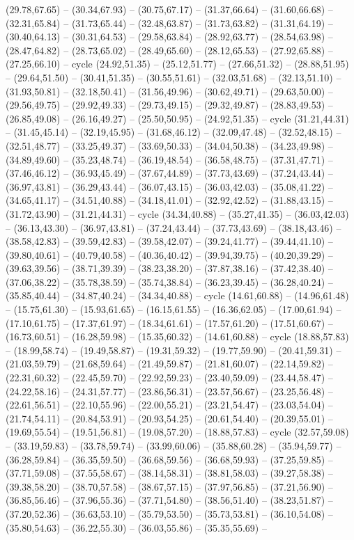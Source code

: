 {(29.78,67.65) -- (30.34,67.93) -- (30.75,67.17) -- (31.37,66.64) -- (31.60,66.68) -- (32.31,65.84) -- (31.73,65.44) -- (32.48,63.87) -- (31.73,63.82) -- (31.31,64.19) -- (30.40,64.13) -- (30.31,64.53) -- (29.58,63.84) -- (28.92,63.77) -- (28.54,63.98) -- (28.47,64.82) -- (28.73,65.02) -- (28.49,65.60) -- (28.12,65.53) -- (27.92,65.88) -- (27.25,66.10) -- cycle (24.92,51.35) -- (25.12,51.77) -- (27.66,51.32) -- (28.88,51.95) -- (29.64,51.50) -- (30.41,51.35) -- (30.55,51.61) -- (32.03,51.68) -- (32.13,51.10) -- (31.93,50.81) -- (32.18,50.41) -- (31.56,49.96) -- (30.62,49.71) -- (29.63,50.00) -- (29.56,49.75) -- (29.92,49.33) -- (29.73,49.15) -- (29.32,49.87) -- (28.83,49.53) -- (26.85,49.08) -- (26.16,49.27) -- (25.50,50.95) -- (24.92,51.35) -- cycle (31.21,44.31) -- (31.45,45.14) -- (32.19,45.95) -- (31.68,46.12) -- (32.09,47.48) -- (32.52,48.15) -- (32.51,48.77) -- (33.25,49.37) -- (33.69,50.33) -- (34.04,50.38) -- (34.23,49.98) -- (34.89,49.60) -- (35.23,48.74) -- (36.19,48.54) -- (36.58,48.75) -- (37.31,47.71) -- (37.46,46.12) -- (36.93,45.49) -- (37.67,44.89) -- (37.73,43.69) -- (37.24,43.44) -- (36.97,43.81) -- (36.29,43.44) -- (36.07,43.15) -- (36.03,42.03) -- (35.08,41.22) -- (34.65,41.17) -- (34.51,40.88) -- (34.18,41.01) -- (32.92,42.52) -- (31.88,43.15) -- (31.72,43.90) -- (31.21,44.31) -- cycle (34.34,40.88) -- (35.27,41.35) -- (36.03,42.03) -- (36.13,43.30) -- (36.97,43.81) -- (37.24,43.44) -- (37.73,43.69) -- (38.18,43.46) -- (38.58,42.83) -- (39.59,42.83) -- (39.58,42.07) -- (39.24,41.77) -- (39.44,41.10) -- (39.80,40.61) -- (40.79,40.58) -- (40.36,40.42) -- (39.94,39.75) -- (40.20,39.29) -- (39.63,39.56) -- (38.71,39.39) -- (38.23,38.20) -- (37.87,38.16) -- (37.42,38.40) -- (37.06,38.22) -- (35.78,38.59) -- (35.74,38.84) -- (36.23,39.45) -- (36.28,40.24) -- (35.85,40.44) -- (34.87,40.24) -- (34.34,40.88) -- cycle (14.61,60.88) -- (14.96,61.48) -- (15.75,61.30) -- (15.93,61.65) -- (16.15,61.55) -- (16.36,62.05) -- (17.00,61.94) -- (17.10,61.75) -- (17.37,61.97) -- (18.34,61.61) -- (17.57,61.20) -- (17.51,60.67) -- (16.73,60.51) -- (16.28,59.98) -- (15.35,60.32) -- (14.61,60.88) -- cycle (18.88,57.83) -- (18.99,58.74) -- (19.49,58.87) -- (19.31,59.32) -- (19.77,59.90) -- (20.41,59.31) -- (21.03,59.79) -- (21.68,59.64) -- (21.49,59.87) -- (21.81,60.07) -- (22.14,59.82) -- (22.31,60.32) -- (22.45,59.70) -- (22.92,59.23) -- (23.40,59.09) -- (23.44,58.47) -- (24.22,58.16) -- (24.31,57.77) -- (23.86,56.31) -- (23.57,56.67) -- (23.25,56.48) -- (22.61,56.51) -- (22.10,55.96) -- (22.00,55.21) -- (23.21,54.47) -- (23.03,54.04) -- (21.74,54.11) -- (20.84,53.91) -- (20.93,54.25) -- (20.61,54.40) -- (20.39,55.01) -- (19.69,55.54) -- (19.51,56.81) -- (19.08,57.20) -- (18.88,57.83) -- cycle (32.57,59.08) -- (33.19,59.83) -- (33.78,59.74) -- (33.99,60.06) -- (35.88,60.28) -- (35.94,59.77) -- (36.28,59.84) -- (36.35,59.50) -- (36.68,59.56) -- (36.68,59.93) -- (37.25,59.85) -- (37.71,59.08) -- (37.55,58.67) -- (38.14,58.31) -- (38.81,58.03) -- (39.27,58.38) -- (39.38,58.20) -- (38.70,57.58) -- (38.67,57.15) -- (37.97,56.85) -- (37.21,56.90) -- (36.85,56.46) -- (37.96,55.36) -- (37.71,54.80) -- (38.56,51.40) -- (38.23,51.87) -- (37.20,52.36) -- (36.63,53.10) -- (35.79,53.50) -- (35.73,53.81) -- (36.10,54.08) -- (35.80,54.63) -- (36.22,55.30) -- (36.03,55.86) -- (35.35,55.69) -- }
